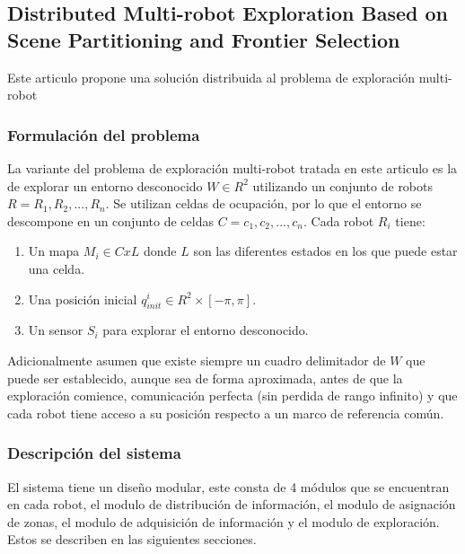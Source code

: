 
\subsection[Distributed Multi-robot Exploration Based on Scene Partitioning and Frontier Selection]{Distributed Multi-robot Exploration Based on\\ Scene Partitioning and Frontier Selection}

Este articulo propone una solución distribuida al problema de exploración multi-robot%

\subsubsection{Formulación del problema}
La variante del problema de exploración multi-robot tratada en este articulo es la de explorar un entorno desconocido $W\in R^2$ utilizando un conjunto de robots $R={R_1,R_2,...,R_n}$. Se utilizan celdas de ocupación, por lo que el entorno se descompone en un conjunto de celdas $C={c_1,c_2,...,c_n}$. Cada robot $R_i$ tiene:
\begin{enumerate}
  \item Un mapa $M_i \in CxL$ donde $L$ son las diferentes estados en los que puede estar una celda. 
  \item Una posición inicial $q_{init}^{i}\in R^2 \times [-\pi,\pi]$. 
  \item Un sensor $S_i$ para explorar el entorno desconocido.
\end{enumerate}

Adicionalmente asumen que existe siempre un cuadro delimitador de $W$ que puede ser establecido, aunque sea de forma aproximada, antes de que la exploración comience, comunicación perfecta (sin perdida de rango infinito) y que cada robot tiene acceso a su posición respecto a un marco de referencia común.

\subsubsection{Descripción del sistema}
El sistema tiene un diseño modular, este consta de 4 módulos que se encuentran en cada robot, el modulo de distribución de información, el modulo de asignación de zonas, el modulo de adquisición de información y el modulo de exploración. Estos se describen en las siguientes secciones. 

